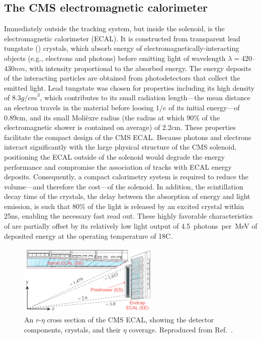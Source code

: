 \subsection{The CMS electromagnetic calorimeter}

Immediately outside the tracking system, but inside the solenoid, is the electromagnetic 
calorimeter (ECAL). It is constructed from transparent lead tungstate (\PbT) crystals, which
absorb energy of electromagnetically-interacting objects (e.g., electrons and photons) before emitting
light of wavelength $\lambda = 420$--$430\unit{nm}$, with intensity proportional to the absorbed energy.
The energy deposits of the interacting particles are obtained from
photodetectors that collect the emitted light.
Lead tungstate was chosen for properties including its high density of $8.3\unit{g/cm}^3$, which contributes
to its small radiation length---the mean distance an electron travels
in the material before loosing $1/e$ of its initial energy---of 0.89\unit{cm},
and its small Moli{\`e}xre radius (the radius at which 90\% of the electromagnetic
shower is contained on average) of 2.2\unit{cm}. These properties facilitate the 
compact design of the CMS ECAL. Because photons and electrons interact significantly
with the large physical structure of the CMS solenoid, positioning the ECAL outside
of the solenoid would degrade the energy performance and compromise the association
of tracks with ECAL energy deposits.
Consequently, a compact calorimetry system
is required to reduce the volume---and therefore the cost---of the solenoid.
In addition, the scintillation decay time of the crystals, the delay between the absorption of energy and light emission,
is such that 80\% of the light is released by an excited crystal within 25\unit{ns},
enabling the necessary fast read out. These highly favorable characteristics of {\PbT} are 
partially offset by its relatively low light output of 4.5~photons~per~MeV of deposited energy
at the operating temperature of 18\degree\unit{C}. 

\begin{figure}[htbp]
  \centering
   \includegraphics[width=0.6\textwidth]{figures/LHCandCMS/ecalCrossSection.png}
  \caption[An $r$-$\eta$ cross section of the CMS ECAL]{
    An $r$-$\eta$ cross section of the CMS ECAL, showing the detector components,
    crystals, and their $\eta$ coverage. Reproduced from Ref.~\cite{Benaglia:2014aqa}.
        }
 \label{fig:ecal}
\end{figure}


